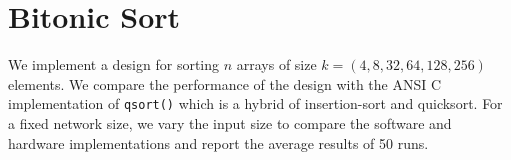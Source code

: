 \section{Bitonic Sort}

We implement a design for sorting $n$ arrays of size $k = (4, 8, 32,
64, 128, 256)$ elements. We compare the performance of the design with
the ANSI C implementation of \texttt{qsort()} which is a hybrid of
insertion-sort and quicksort. For a fixed network size, we vary the
input size to compare the software and hardware implementations and
report the average results of 50 runs.



